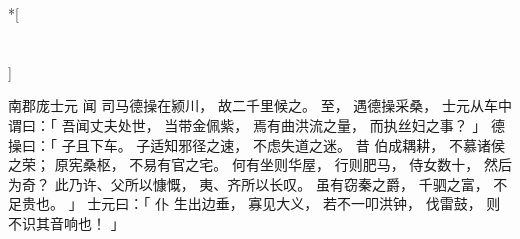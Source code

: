 
\switchcolumn[0]*[\section{}]

南郡庞士元
闻
司马德操在颍川，
故二千里候之。
至，
遇德操采桑，
士元从车中谓曰：「
    吾闻丈夫处世，
    当带金佩紫，
    焉有曲洪流之量，
    而执丝妇之事？
」
德操曰：「
    子且下车。
    子适知邪径之速，
      不虑失道之迷。
    昔
    伯成耦耕，
    不慕诸侯之荣；
    原宪桑枢，
    不易有官之宅。
    何有坐则华屋，
        行则肥马，
        侍女数十，
    然后为奇？
    此乃许、父所以慷慨，
        夷、齐所以长叹。
    虽有窃秦之爵，
    千驷之富，
    不足贵也。
」
士元曰：「
    仆
    生出边垂，
    寡见大义，
    若不一叩洪钟，
    伐雷鼓，
    则不识其音响也！
」

\switchcolumn



